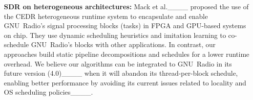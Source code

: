 \textbf{SDR on heterogeneous architectures:} Mack et al.____ proposed the use of the CEDR heterogeneous runtime system to encapsulate and enable GNU~Radio’s signal processing blocks (tasks) in FPGA and GPU-based systems on chip.
They use dynamic scheduling heuristics and imitation learning to co-schedule GNU~Radio’s blocks with other applications.
In contrast, our approaches build static pipeline decompositions and schedules for a lower runtime overhead.
We believe our algorithms can be integrated to GNU~Radio in its future version (4.0)____ when it will abandon its thread-per-block schedule, enabling better performance by avoiding its current issues related to locality and OS scheduling policies____.